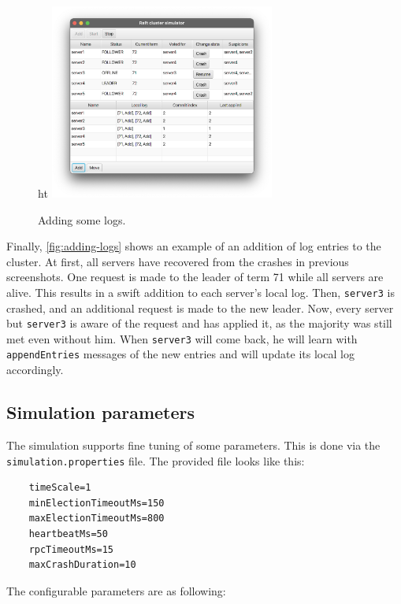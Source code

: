 \begin{figure}ht
    \centering
    \includegraphics[width=0.66\textwidth]{drawable/4-some-logs.png}
    
    \caption{Adding some logs.}
    \label{fig:adding-logs}
\end{figure}

Finally, \autoref{fig:adding-logs} shows an example of an addition of log entries to the cluster. At first, all servers have recovered from the crashes in previous screenshots. One request is made to the leader of term 71 while all servers are alive. This results in a swift addition to each server's local log. Then, \texttt{server3} is crashed, and an additional request is made to the new leader. Now, every server but \texttt{server3} is aware of the request and has applied it, as the majority was still met even without him. When \texttt{server3} will come back, he will learn with \texttt{appendEntries} messages of the new entries  and will update its local log accordingly.

\subsection{Simulation parameters}

The simulation supports fine tuning of some parameters. This is done via the \verb=simulation.properties= file. The provided file looks like this:

\begin{verbatim}
    timeScale=1
    minElectionTimeoutMs=150
    maxElectionTimeoutMs=800
    heartbeatMs=50
    rpcTimeoutMs=15
    maxCrashDuration=10
\end{verbatim}

The configurable parameters are as following:

